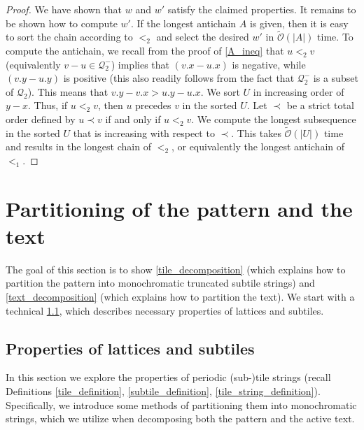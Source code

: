 \documentclass[11pt, letterpaper]{article}
\theoremstyle{plain}
\theoremstyle{definition}
\theoremstyle{remark}
\newcommand{\tO}{\tilde{\mathcal{O}}}
\newcommand{\Q}{\mathcal{Q}}
\newcommand{\absolute}[1]{\left\lvert#1\right\rvert}
\begin{document}
\begin{proof}
We have shown that $w$ and $w'$ satisfy the claimed properties. 
It remains to be shown how to compute $w'$. 
If the longest antichain $A$ is given, then it is easy to sort the chain according to $<_2$ and select the desired $w'$ in $\tO(\absolute{A})$ time. To compute the antichain, we recall from the proof of \cref{A_ineq} that $u <_2 v$ (equivalently $v - u \in \Q_2^-$) implies that $(v.x - u.x)$ is negative, while $(v.y - u.y)$ is positive (this also readily follows from the fact that $\Q_2^-$ is a subset of $\Q_2$). This means that $v.y - v.x > u.y - u.x$. We sort $U$ in increasing order of $y - x$. Thus, if $u <_2 v$, then $u$ precedes $v$ in the sorted $U$. 
Let $\prec$ be a strict total order defined by $u \prec v$ if and only if $u <_2 v$. We compute the longest subsequence in the sorted $U$ that is increasing with respect to $\prec$. This takes $\tO(\absolute{U})$ time \cite{TODO} and results in the longest chain of $<_2$, or equivalently the longest antichain of $<_1$.
\end{proof}

\section{Partitioning of the pattern and the text}
The goal of this section is to show \cref{tile_decomposition} (which explains how to partition the pattern into monochromatic truncated subtile strings) and \cref{text_decomposition} (which explains how to partition the text). We start with a technical \cref{sec:lattices_subtiles}, which describes necessary properties of lattices and subtiles. 
 
\subsection{Properties of lattices and subtiles} \label{sec:lattices_subtiles}
In this section we explore the properties of periodic (sub-)tile strings (recall Definitions \ref{tile_definition}, \ref{subtile_definition}, \ref{tile_string_definition}).
Specifically, we introduce some methods of partitioning them into monochromatic strings, which we utilize when decomposing both the pattern and the active text.
\end{document}
